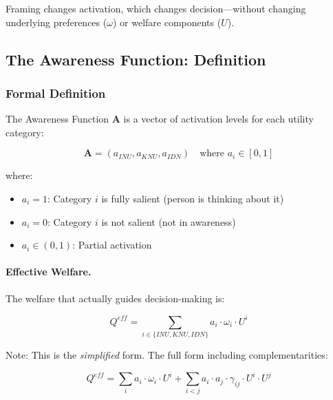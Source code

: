 Framing changes activation, which changes decision---without changing
underlying preferences ($\omega$) or welfare components ($U$).

\subsection{The Awareness Function: Definition}
\label{subsec:awareness-definition}

\subsubsection{Formal Definition}

\begin{definition}
\label{def:awareness-function}
The Awareness Function $\mathbf{A}$ is a vector of activation levels for each
utility category:

\begin{equation}
\mathbf{A} = (a_{INU}, a_{KNU}, a_{IDN}) \quad \text{where } a_i \in [0, 1]
\end{equation}

where:
\begin{itemize}
\item $a_i = 1$: Category $i$ is fully salient (person is thinking about it)
\item $a_i = 0$: Category $i$ is not salient (not in awareness)
\item $a_i \in (0,1)$: Partial activation
\end{itemize}
\end{definition}

\paragraph{Effective Welfare.}
The welfare that actually guides decision-making is:

\begin{equation}
\boxed{Q^{eff} = \sum_{i \in \{INU, KNU, IDN\}} a_i \cdot \omega_i \cdot U^i}
\label{eq:effective-welfare}
\end{equation}

Note: This is the \emph{simplified} form. The full form including complementarities:

\begin{equation}
Q^{eff} = \sum_{i} a_i \cdot \omega_i \cdot U^i + \sum_{i<j} a_i \cdot a_j \cdot \gamma_{ij} \cdot U^i \cdot U^j
\end{equation}

